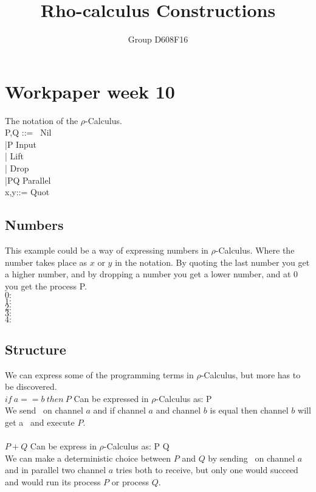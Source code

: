 

\author{Group D608F16}
\title{Rho-calculus Constructions}



\maketitle

\section{Workpaper week 10}
The notation of the $\rho$-Calculus.\citep{Meredith2005}\\
P,Q ::= \nil \ Nil\\
|P Input\\
| Lift\\
| Drop\\
|P\para Q Parallel\\
x,y::=  Quot\\


\subsection{Numbers}
This example could be a way of expressing numbers in $\rho$-Calculus. Where the number takes place as $x$ or $y$ in the notation. By quoting the last number you get a higher number, and by dropping a number you get a lower number, and at 0 you get the process P.\\
$0:$ \quot{\nil}\\
$1:$ \quot{\lift{\quot{\nil}}{\nil}}\\
$2:$ \quot{\lift{\quot{\nil}}{\lift{\quot{\nil}}{\nil}}}\\
$3:$ \quot{\lift{\quot{\nil}}{\lift{\quot{\nil}}{\lift{\quot{\nil}}{\nil}}}}\\
$4:$ \quot{\lift{\quot{\nil}}{\lift{\quot{\nil}}{\lift{\quot{\nil}}{\lift{\quot{\nil}}{\nil}}}}}\\

\subsection{Structure}
We can express some of the programming terms in $\rho$-Calculus, but more has to be discovered.\\
$if\ a == b\ then\ P$ Can be expressed in $\rho$-Calculus as:  \para {}P
\\ We send \nil \ on channel $a$ and if channel $a$ and channel $b$ is equal then channel $b$ will get a \nil \ and execute $P$.
\\\\
$P+Q$ Can be express in $\rho$-Calculus as:  \para {}P \para {}Q
\\We can make a deterministic choice between $P$ and $Q$ by sending \nil \ on channel $a$ and in parallel two channel $a$ tries both to receive, but only one would succeed and would run its process $P$ or process $Q$.

